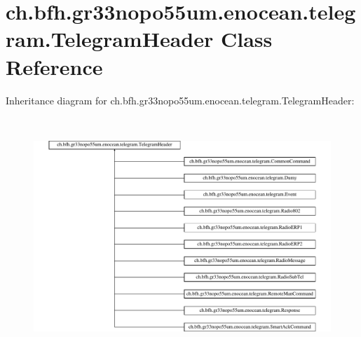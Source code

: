 \hypertarget{classch_1_1bfh_1_1gr33nopo55um_1_1enocean_1_1telegram_1_1_telegram_header}{}\section{ch.\+bfh.\+gr33nopo55um.\+enocean.\+telegram.\+Telegram\+Header Class Reference}
\label{classch_1_1bfh_1_1gr33nopo55um_1_1enocean_1_1telegram_1_1_telegram_header}
Inheritance diagram for ch.\+bfh.\+gr33nopo55um.\+enocean.\+telegram.\+Telegram\+Header\+:\begin{figure}[H]
\begin{center}
\leavevmode
\includegraphics[height=8.983957cm]{classch_1_1bfh_1_1gr33nopo55um_1_1enocean_1_1telegram_1_1_telegram_header}
\end{center}
\end{figure}
